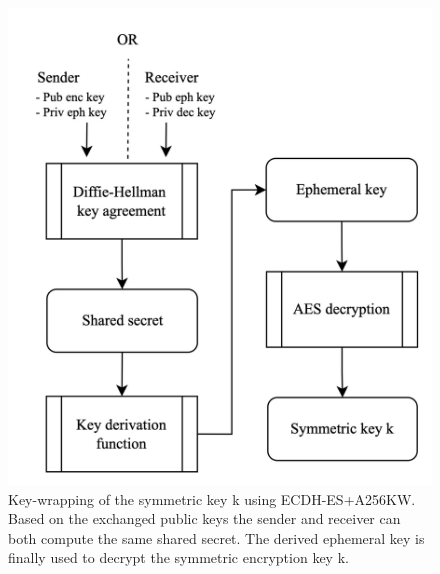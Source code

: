 \documentclass[../main.tex]{subfiles}
\begin{document}
\begin{figure}[ht]
    \includegraphics[scale=0.2]{../img/07/key_wrapping.jpg}
    \centering
    \caption[Key-wrapping ECDH-ES+A256KW]{
        Key-wrapping of the symmetric key k using ECDH-ES+A256KW.
        Based on the exchanged public keys the sender and receiver can both compute the same shared secret.
        The derived ephemeral key is finally used to decrypt the symmetric encryption key k.}
    \label{fig:key_wrapping}
\end{figure}
\end{document}
